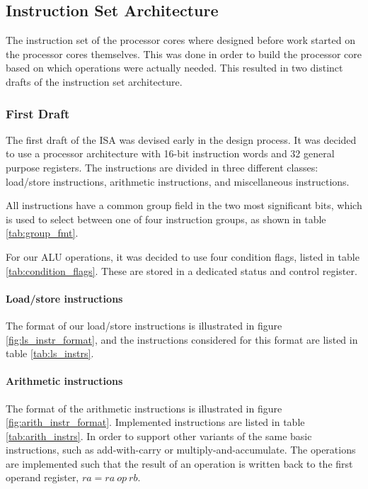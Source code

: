 \subsection{Instruction Set Architecture}\label{section:fpga-isa}

The instruction set of the processor cores where designed before work
started on the processor cores themselves. This was done in order
to build the processor core based on which operations were actually
needed. This resulted in two distinct drafts of the instruction set
architecture.

\subsubsection{First Draft}
The first draft of the ISA was devised early in the design process.
It was decided to use a processor architecture with 16-bit instruction words
and 32 general purpose registers. The instructions are divided in three
different classes: load/store instructions, arithmetic instructions, and
miscellaneous instructions.

All instructions have a common group field in the two most significant bits,
which is used to select between one of four instruction groups, as shown in
table \ref{tab:group_fmt}.

For our ALU operations, it was decided to use four condition flags, listed in
table \ref{tab:condition_flags}. These are stored in a dedicated status and
control register.




\paragraph{Load/store instructions}
The format of our load/store instructions is illustrated in figure
\ref{fig:ls_instr_format}, and the instructions considered for this format
are listed in table \ref{tab:ls_instrs}.




\paragraph{Arithmetic instructions}
The format of the arithmetic instructions is illustrated in figure
\ref{fig:arith_instr_format}.
Implemented instructions are listed in table \ref{tab:arith_instrs}. In order
to support other variants of the same basic instructions, such as add-with-carry
or multiply-and-accumulate. The operations are implemented such that the result
of an operation is written back to the first operand register, $ra = ra~op~rb$.

